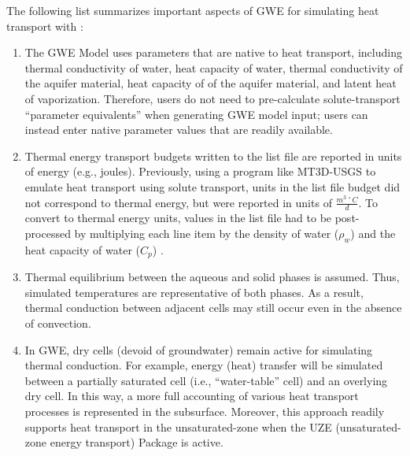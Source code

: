 The following list summarizes important aspects of GWE for simulating heat transport with \mf:

\begin{enumerate}

\item The GWE Model uses parameters that are native to heat transport, including thermal conductivity of water, heat capacity of water, thermal conductivity of the aquifer material, heat capacity of of the aquifer material, and latent heat of vaporization. Therefore, users do not need to pre-calculate solute-transport ``parameter equivalents'' when generating GWE model input; users can instead enter native parameter values that are readily available.

\item Thermal energy transport budgets written to the \mf list file are reported in units of energy (e.g., joules).  Previously, using a program like MT3D-USGS \citep{mt3dusgs} to emulate heat transport using solute transport, units in the list file budget did not correspond to thermal energy, but were reported in units of $\frac{m^{3 \;\circ}C}{d}$. To convert to thermal energy units, values in the list file had to be post-processed by multiplying each line item by the density of water ($\rho_w$) and the heat capacity of water ($C_p$) \citep{langevin2008seawat}.

\item Thermal equilibrium between the aqueous and solid phases is assumed.  Thus, simulated temperatures are representative of both phases.  As a result, thermal conduction between adjacent cells may still occur even in the absence of convection.

\item In GWE, dry cells (devoid of groundwater) remain active for simulating thermal conduction. For example, energy (heat) transfer will be simulated between a partially saturated cell (i.e., ``water-table'' cell) and an overlying dry cell. In this way, a more full accounting of various heat transport processes is represented in the subsurface.  Moreover, this approach readily supports heat transport in the unsaturated-zone when the UZE (unsaturated-zone energy transport) Package is active.  


\end{enumerate}
